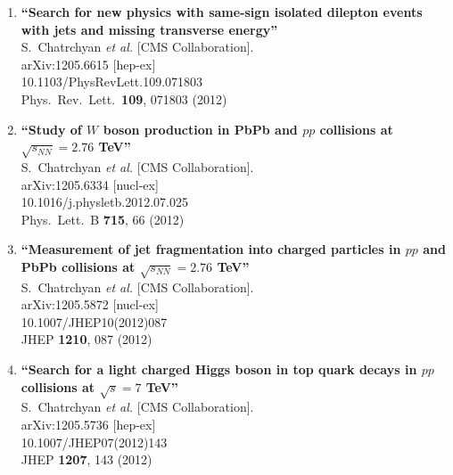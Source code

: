 \documentclass{article}
\begin{document}
\begin{enumerate}
\item%
{\bf ``Search for new physics with same-sign isolated dilepton events with jets and missing transverse energy''}
  \\{}S.~Chatrchyan {\it et al.}  [CMS Collaboration].
  \\{}arXiv:1205.6615 [hep-ex]
    \\{}10.1103/PhysRevLett.109.071803
\\{}Phys.\ Rev.\ Lett.\  {\bf 109}, 071803 (2012) %


\item%
{\bf ``Study of $W$ boson production in PbPb and $pp$ collisions at $\sqrt{s_{NN}}=2.76$ TeV''}
  \\{}S.~Chatrchyan {\it et al.}  [CMS Collaboration].
  \\{}arXiv:1205.6334 [nucl-ex]
    \\{}10.1016/j.physletb.2012.07.025
\\{}Phys.\ Lett.\ B {\bf 715}, 66 (2012) %


\item%
{\bf ``Measurement of jet fragmentation into charged particles in $pp$ and PbPb collisions at $\sqrt{s_{NN}}=2.76$ TeV''}
  \\{}S.~Chatrchyan {\it et al.}  [CMS Collaboration].
  \\{}arXiv:1205.5872 [nucl-ex]
    \\{}10.1007/JHEP10(2012)087
\\{}JHEP {\bf 1210}, 087 (2012) %


\item%
{\bf ``Search for a light charged Higgs boson in top quark decays in $pp$ collisions at $\sqrt{s}=7$ TeV''}
  \\{}S.~Chatrchyan {\it et al.}  [CMS Collaboration].
  \\{}arXiv:1205.5736 [hep-ex]
    \\{}10.1007/JHEP07(2012)143
\\{}JHEP {\bf 1207}, 143 (2012) %



\end{enumerate}
\end{document}
